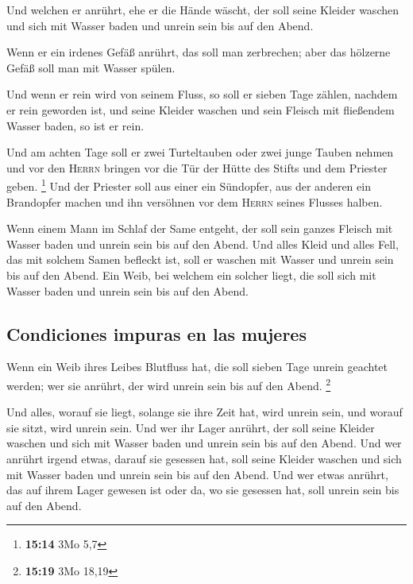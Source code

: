  Und welchen er anrührt, ehe er die Hände wäscht, der
soll seine Kleider waschen und sich mit Wasser baden und unrein sein bis
auf den Abend.

 Wenn er ein irdenes Gefäß anrührt, das soll man
zerbrechen; aber das hölzerne Gefäß soll man mit Wasser spülen.

 Und wenn er rein wird von seinem Fluss, so soll er
sieben Tage zählen, nachdem er rein geworden ist, und seine Kleider
waschen und sein Fleisch mit fließendem Wasser baden, so ist er rein.

 Und am achten Tage soll er zwei Turteltauben oder zwei
junge Tauben nehmen und vor den \textsc{Herrn} bringen vor die Tür der
Hütte des Stifts und dem Priester geben. \footnote{\textbf{15:14} 3Mo
  5,7}  Und der Priester soll aus einer ein Sündopfer,
aus der anderen ein Brandopfer machen und ihn versöhnen vor dem
\textsc{Herrn} seines Flusses halben.

 Wenn einem Mann im Schlaf der Same entgeht, der soll
sein ganzes Fleisch mit Wasser baden und unrein sein bis auf den Abend.
 Und alles Kleid und alles Fell, das mit solchem Samen
befleckt ist, soll er waschen mit Wasser und unrein sein bis auf den
Abend.  Ein Weib, bei welchem ein solcher liegt, die soll
sich mit Wasser baden und unrein sein bis auf den Abend.

\hypertarget{condiciones-impuras-en-las-mujeres}{%
\subsection{Condiciones impuras en las
mujeres}\label{condiciones-impuras-en-las-mujeres}}

 Wenn ein Weib ihres Leibes Blutfluss hat, die soll
sieben Tage unrein geachtet werden; wer sie anrührt, der wird unrein
sein bis auf den Abend. \footnote{\textbf{15:19} 3Mo 18,19}

 Und alles, worauf sie liegt, solange sie ihre Zeit hat,
wird unrein sein, und worauf sie sitzt, wird unrein sein.
 Und wer ihr Lager anrührt, der soll seine Kleider
waschen und sich mit Wasser baden und unrein sein bis auf den Abend.
 Und wer anrührt irgend etwas, darauf sie gesessen hat,
soll seine Kleider waschen und sich mit Wasser baden und unrein sein bis
auf den Abend.  Und wer etwas anrührt, das auf ihrem
Lager gewesen ist oder da, wo sie gesessen hat, soll unrein sein bis auf
den Abend.

